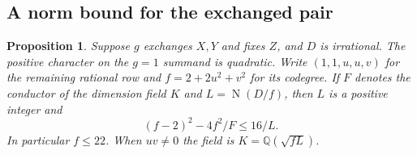 \documentclass[11pt,a4paper]{article}
\newtheorem{proposition}[theorem]{Proposition}
\numberwithin{equation}{section}
\begin{document}
\subsection{A norm bound for the exchanged pair}
\begin{proposition}\label{prop:exchange-large}
Suppose $g$ exchanges $X,Y$ and fixes $Z$, and $D$ is irrational. The positive character on the $g=1$ summand is quadratic. Write $(1,1,u,u,v)$ for the remaining rational row and $f=2+2u^2+v^2$ for its codegree. If $F$ denotes the conductor of the dimension field $K$ and $L=\operatorname N(D/f)$, then $L$ is a positive integer and
\begin{equation}\label{eq:exchange-norm-gap}
 (f-2)^2-4f^2/F\le 16/L .
\end{equation}
In particular $f\le22$. When $uv\ne0$ the field is $K=\mathbb Q(\sqrt{fL})$.
\end{proposition}
\end{document}
